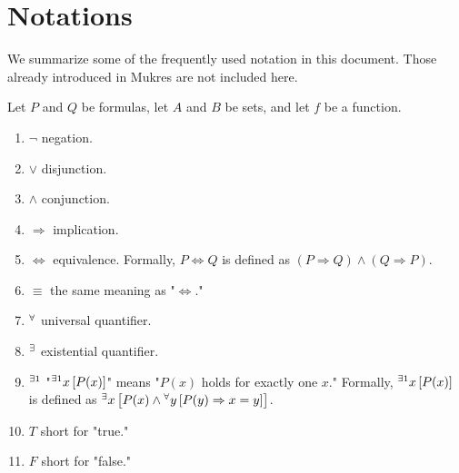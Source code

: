 \documentclass[a4paper,12pt]{article}
\begin{document}
\section*{Notations}
We summarize some of the frequently used notation in this document.
Those already introduced in Mukres \cite{Munkres:Topology} are not included here.

Let \( P \) and \( Q \) be formulas,
let \( A \) and \( B \) be sets, and let \( f \) be a function.
\begin{enumerate}
	\renewcommand{\labelenumi}{\(\diamond\)}
	\item
	      \( \neg \)\COLON
	      negation.
	      
	\item
	      \( \vee \)\COLON
	      disjunction.
	      
	\item
	      \( \wedge \)\COLON
	      conjunction.
	      
	\item
	      \( \Rightarrow \)\COLON
	      implication.
	      
	\item
	      \( \Leftrightarrow \)\COLON
	      equivalence.
	      Formally,
	      \( P \Leftrightarrow Q \) is defined as
	      \( (P \Rightarrow Q) \wedge (Q \Rightarrow P)\).
	      
	\item
	      \( \equiv \)\COLON
	      the same meaning as "\( \Leftrightarrow \)."
	      
	\item
	      \( {}^{\forall} \)\COLON
	      universal quantifier.
	      
	\item
	      \( {}^{\exists}\)\COLON
	      existential quantifier.
	      
	\item
	      \( {}^{\exists 1}\)\COLON
	      "\( {}^{\exists 1} x\left[ P(x) \right]\)"
	      means
	      "\( P(x) \) holds for exactly one \( x \)."
	      Formally,
	      \( {}^{\exists 1} x\left[ P(x) \right]\)
	      is defined as
	      \({}^{\exists} x
	      \left[ P(x) \wedge {}^{\forall}  y\left[ P(y) \Rightarrow x=y \right] \right]\).
	      
	      
	\item
	      \( T \)\COLON
	      short for "true."
	      
	\item
	      \( F \)\COLON
	      short for "false."
	      

\end{enumerate}
\end{document}
